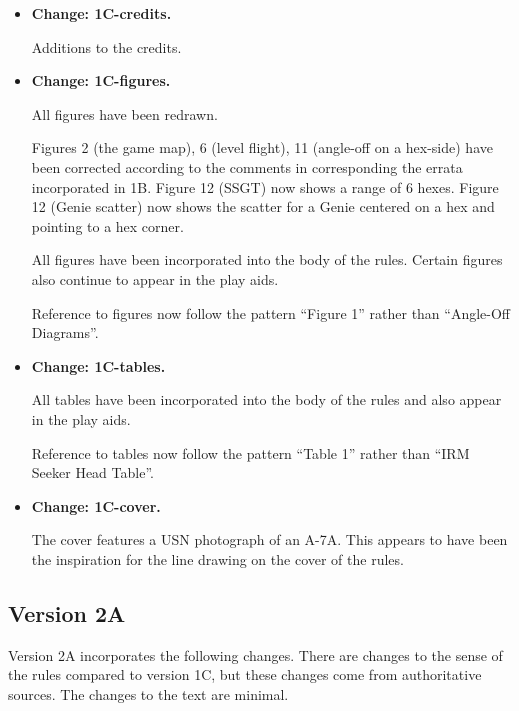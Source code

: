 \documentclass[10pt]{report}
\newcommand{\itemtag}[1]{\item \textbf{Change: #1.}\par}
\begin{document}
\begin{itemize}
    \itemtag{1C-credits} Additions to the credits.

    \itemtag{1C-figures} All figures have been redrawn. 
    
    Figures 2 (the game map), 6 (level flight), 11 (angle-off on a hex-side) have been corrected according to the comments in corresponding the errata incorporated in 1B. Figure 12 (SSGT) now shows a range of 6 hexes. Figure 12 (Genie scatter) now shows the scatter for a Genie centered on a hex and pointing to a hex corner.
    
    All figures have been incorporated into the body of the rules. Certain figures also continue to appear in the play aids.
    
    Reference to figures now follow the pattern “Figure 1” rather than “Angle-Off Diagrams”.

    \itemtag{1C-tables} All tables have been incorporated into the body of the rules and also appear in the play aids. 
    
    Reference to tables now follow the pattern “Table 1” rather than “IRM Seeker Head Table”.

    \itemtag{1C-cover} The cover features a USN photograph of an A-7A. This appears to have been the inspiration for the line drawing on the cover of the {\TSOH} rules.

\end{itemize}

\subsection{Version 2A}

Version 2A incorporates the following changes. There are changes to the sense of the rules compared to version 1C, but these changes come from authoritative sources. The changes to the text are minimal.
\end{document}
